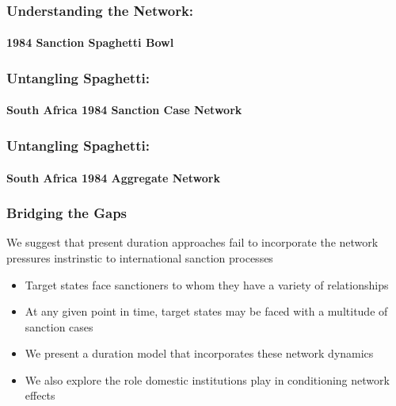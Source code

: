 \begin{frame}
\frametitle{Understanding the Network:}
\framesubtitle{1984 Sanction Spaghetti Bowl}
\vspace{-0.25cm}

\end{frame}

\begin{frame}
\frametitle{Untangling Spaghetti:}
\framesubtitle{South Africa 1984 Sanction Case Network}

\vspace{-.4cm}

\end{frame}

\begin{frame}
\frametitle{Untangling Spaghetti:}
\framesubtitle{South Africa 1984 Aggregate Network}


\end{frame}

\begin{frame}
\frametitle{Bridging the Gaps}
We suggest that present duration approaches fail to incorporate the network pressures instrinstic to international sanction processes

\begin{itemize}
	\item Target states face sanctioners to whom they have a variety of relationships
	\item At any given point in time, target states may be faced with a multitude of sanction cases
	\item We present a duration model that incorporates these network dynamics
	\item We also explore the role domestic institutions play in conditioning network effects
\end{itemize}

\end{frame}

